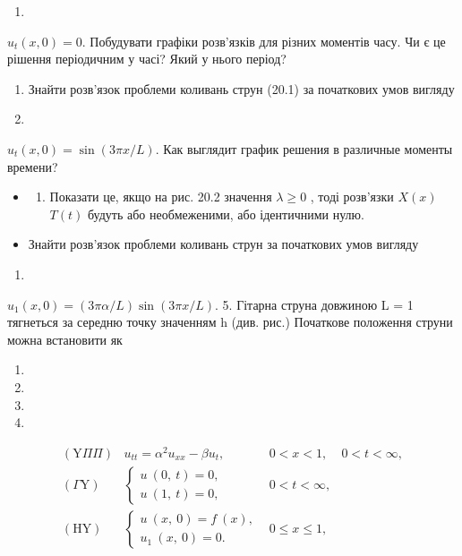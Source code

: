 \documentclass[
  ukrainian,
]{article}
\providecommand{\tightlist}{%
  \setlength{\itemsep}{0pt}\setlength{\parskip}{0pt}}
\begin{document}
\begin{enumerate}
\def\labelenumi{\arabic{enumi}.}
\setcounter{enumi}{9}
\tightlist
\item
\end{enumerate}

\(u_t(x, 0) = 0.\) Побудувати графіки розв'язків для різних моментів
часу. Чи є це рішення періодичним у часі? Який у нього період?

\begin{enumerate}
\def\labelenumi{\arabic{enumi}.}
\setcounter{enumi}{1}
\item
  Знайти розв'язок проблеми коливань струн (20.1) за початкових умов
  вигляду
\item
\end{enumerate}

\(u_t(x, 0) = \sin(3\pi x/L).\) Как выглядит график решения в различные
моменты времени?

\begin{itemize}
\tightlist
\item
  \begin{enumerate}
  \def\labelenumi{\arabic{enumi}.}
  \setcounter{enumi}{2}
  \tightlist
  \item
    Показати це, якщо на рис. 20.2 значення \(\lambda \geqslant 0\) ,
    тоді розв'язки \(X(x)\) \(T(t)\) будуть або необмеженими, або
    ідентичними нулю.
  \end{enumerate}
\item
  Знайти розв'язок проблеми коливань струн за початкових умов вигляду
\end{itemize}

\begin{enumerate}
\def\labelenumi{\arabic{enumi}.}
\setcounter{enumi}{11}
\tightlist
\item
\end{enumerate}

\(u_1(x, 0) = (3\pi \alpha/L)\sin(3\pi x/L).\) 5. Гітарна струна
довжиною L = 1 тягнеться за середню точку значенням h (див. рис.)
Початкове положення струни можна встановити як

\begin{enumerate}
\def\labelenumi{\arabic{enumi}.}
\setcounter{enumi}{12}
\tightlist
\item
\item
\item
\item
\end{enumerate}

\[
\begin{array}{llll} (\mathrm{Y} \Pi \Pi) & u_{tt} = \alpha^2 u_{xx} - \beta u_t, & 0 < x < 1, & 0 < t < \infty, \\ (\Gamma \mathrm{Y}) & \begin{cases} u \ (0, \ t) = 0, \\ u \ (1, \ t) = 0, \end{cases} & 0 < t < \infty, \\ (\mathrm{H} \mathrm{Y}) & \begin{cases} u \ (x, \ 0) = f \ (x), \\ u_1 \ (x, \ 0) = 0. \end{cases} & 0 \leqslant x \leqslant 1, \end{array}
\]
\end{document}
